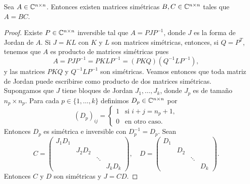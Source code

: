 \begin{cor}
    Sea $A\in\mathbb{C}^{n\times n}$. Entonces existen matrices simétricas
    $B,C\in\mathbb{C}^{n\times n}$ tales que $A=BC$.

    \begin{proof}
        Existe $P\in\mathbb{C}^{n\times n}$ inversible tal que $A=PJP^{-1}$, donde $J$
        es la forma de Jordan de $A$.  Si $J=KL$ con $K$ y $L$ son matrices
        simétricas, entonces, si $Q=P^T$, tenemos que $A$ es producto de
        matrices simétricas pues 
        \[
        A=PJP^{-1}=PKLP^{-1}=(PKQ)(Q^{-1}LP^{-1}),
        \]
        y las matrices $PKQ$ y $Q^{-1}LP^{-1}$ son simétricas. 
        Veamos entonces que toda matriz de Jordan puede escribirse como
        producto de dos matrices simétricas. Supongamos que $J$ tiene bloques
        de Jordan $J_1,\dots,J_k$, donde $J_p$ es de tamaño $n_p\times n_p$.
        Para cada $p\in\{1,\dots,k\}$ definimos $D_p\in\mathbb{C}^{n\times n}$ por
        \[
        (D_p)_{ij}=\begin{cases}
            1 & \text{si $i+j=n_p+1$},\\
            0 & \text{en otro caso}.
        \end{cases}
        \]
        Entonces $D_p$ es simétrica e inversible con $D_p^{-1}=D_p$. Sean
        \[
            C=\begin{pmatrix}
                J_1D_1\\
                & J_2D_2\\
                & & \ddots\\
                && & J_kD_k
            \end{pmatrix},
            \quad
            D=\begin{pmatrix}
                D_1\\
                & D_2\\
                & & \ddots\\
                && & D_k
            \end{pmatrix}.
        \]
        Entonces $C$ y $D$ son simétricas y $J=CD$. 
    \end{proof}
\end{cor}
